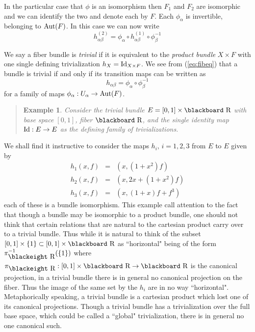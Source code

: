 \documentclass[12pt,titlepage]{article}
\def\bbf#1{\hbox{\blackboard #1}}
\def\bbfeight#1{\hbox{\blackeight #1}}
\def\lR{\bbf R}
\def\lRe{\bbfeight R}
\def\Aut{\hbox{Aut}}
\def\Id{\hbox{Id}}
\newtheorem{eg}{Example}
\newenvironment{example}{\begin{quote}\begin{eg}}{\end{eg}\end{quote}}
\begin{document}
In the particular case that \(\phi\) is an isomorphism then \(F_1\) and
\(F_2\) are isomorphic and we can identify the two and denote each by
\(F\). Each \(\phi_\alpha\) is invertible, belonging to \(\Aut(F)\). In
this
case we can now write
\begin{equation}\label{eq:fibeq}
h^{(2)}_{\alpha\beta}= \phi_\alpha\circ
h^{(1)}_{\alpha\beta}\circ\phi_\beta^{-1}
\end{equation}%


We say a fiber bundle is {\em trivial\/}
%
 if it is equivalent to the {\em
product bundle\/}
%
 \(X\times F\) with one single defining 
trivialization
\(h_X = \Id_{X\times F}\).
We see from (\ref{eq:fibeq}) that a bundle is
trivial if and only if its transition maps can be written as
\[
h_{\alpha\beta} =
\phi_\alpha\circ\phi_\beta^{-1}
\]
 for a family of maps  \(\phi_\alpha:
U_\alpha \to \Aut(F)\).
\begin{example}\label{ex:trivnottriv}
Consider the trivial bundle \(E=[0,1]\times\lR\) with base space
\([0,1]\),
fiber \(\lR\), and the single identity map \(\Id:E\to E\) 
as the defining family of  trivializations.
\end{example}%

We shall find it instructive to consider the maps \(h_i,\,i=1,2,3\) 
from \(E\) to \(E\) given by
\begin{eqnarray*}
h_1(x,f) &=& (x, (1+x^2)f) \\ 
h_2(x,f) &=& (x, 2x+(1+x^2)f) \\ 
h_3(x,f) &=& (x, (1+x)f + f^3)
\end{eqnarray*}%
each of these is a bundle isomorphism. This example call attention to
the fact that though a bundle may be isomorphic to a product bundle, one
should not think that certain relations that are natural to the
cartesian product carry over to a trivial bundle. Thus while it is
natural to think of the subset \([0,1]\times\{1\}\subset
[0,1]\times\lR\) as ``horizontal" being of the form \(\pi_{\lRe}^{-1}
(\{1\})\) where \(\pi_{\lRe}:[0,1]\times\lR\to \lR\) is the canonical
projection, in a trivial bundle there is in general 
no canonical projection on the
fiber.  Thus the image of the same set by the \(h_i\) are in no way
``horizontal". Metaphorically speaking, a trivial bundle is a cartesian
product which lost one of its canonical projections.
Though a trivial bundle has a  trivialization over the 
full base space, which could be called a ``global" trivialization,
there is in general no one canonical such.
\end{document}

